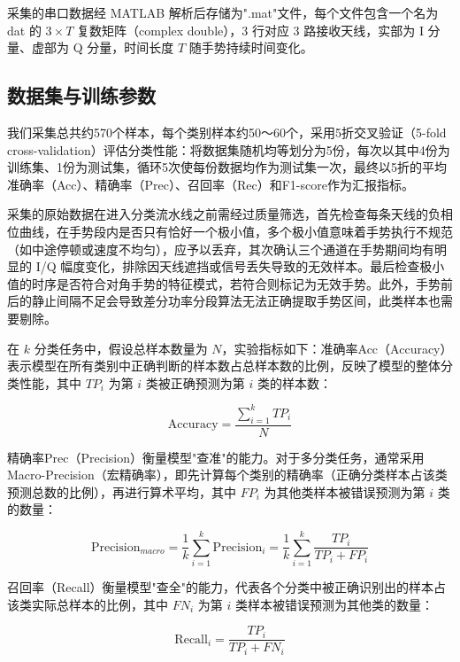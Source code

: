 采集的串口数据经 MATLAB 解析后存储为".mat"文件，每个文件包含一个名为 dat 的 $3 \times T$ 复数矩阵（complex double），3 行对应 3 路接收天线，实部为 I 分量、虚部为 Q 分量，时间长度 $T$ 随手势持续时间变化。

\subsection{数据集与训练参数}

我们采集总共约570个样本，每个类别样本约50～60个，采用5折交叉验证（5-fold cross-validation）评估分类性能：将数据集随机均等划分为5份，每次以其中4份为训练集、1份为测试集，循环5次使每份数据均作为测试集一次，最终以5折的平均准确率（Acc）、精确率（Prec）、召回率（Rec）和F1-score作为汇报指标。

采集的原始数据在进入分类流水线之前需经过质量筛选，首先检查每条天线的负相位曲线，在手势段内是否只有恰好一个极小值，多个极小值意味着手势执行不规范（如中途停顿或速度不均匀），应予以丢弃，其次确认三个通道在手势期间均有明显的 I/Q 幅度变化，排除因天线遮挡或信号丢失导致的无效样本。最后检查极小值的时序是否符合对角手势的特征模式，若符合则标记为无效手势。此外，手势前后的静止间隔不足会导致差分功率分段算法无法正确提取手势区间，此类样本也需要剔除。

在 $k$ 分类任务中，假设总样本数量为 $N$，实验指标如下：准确率Acc（Accuracy）表示模型在所有类别中正确判断的样本数占总样本数的比例，反映了模型的整体分类性能，其中 $TP_{i}$ 为第 $i$ 类被正确预测为第 $i$ 类的样本数：

\begin{equation}
    \mathrm{Accuracy} = \frac{\sum_{i=1}^{k}TP_{i}}{N}
\end{equation}

精确率Prec（Precision）衡量模型"查准"的能力。对于多分类任务，通常采用 Macro-Precision（宏精确率），即先计算每个类别的精确率（正确分类样本占该类预测总数的比例），再进行算术平均，其中 $FP_{i}$ 为其他类样本被错误预测为第 $i$ 类的数量：

\begin{equation}
    \mathrm{Precision}_{macro} = \frac{1}{k}\sum_{i=1}^{k}\mathrm{Precision}_{i} = \frac{1}{k}\sum_{i=1}^{k}\frac{TP_{i}}{TP_{i} + FP_{i}}
\end{equation}

召回率（Recall）衡量模型"查全"的能力，代表各个分类中被正确识别出的样本占该类实际总样本的比例，其中 $FN_{i}$ 为第 $i$ 类样本被错误预测为其他类的数量：

\begin{equation}
    \mathrm{Recall}_{i} = \frac{TP_{i}}{TP_{i} + FN_{i}}
\end{equation}

